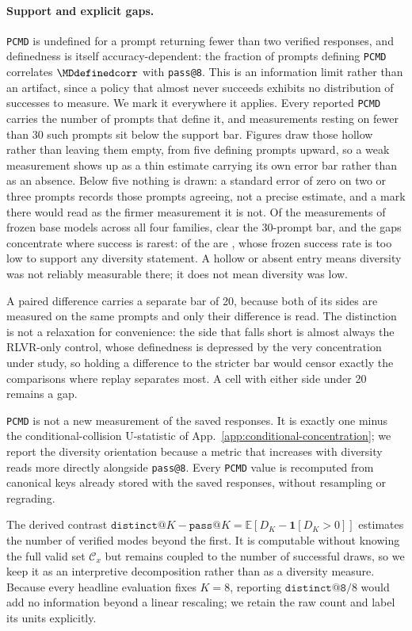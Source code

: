 \documentclass{article}
\newcommand{\1}{\mathbf 1}
\newcommand{\E}{\mathbb E}
\newcommand{\pmd}{\texttt{PCMD}}
\theoremstyle{remark}
\theoremstyle{definition}
\theoremstyle{plain}
\begin{document}
\paragraph{Support and explicit gaps.}
\pmd{} is undefined for a prompt returning fewer than two verified responses,
and definedness is itself accuracy-dependent: the fraction of prompts defining
\pmd{} correlates $\MDdefinedcorr$ with \texttt{pass@8}. This is an information
limit rather than an artifact, since a policy that almost never succeeds
exhibits no distribution of successes to measure. We mark it everywhere it
applies.
Every reported \pmd{} carries the number of prompts that define it, and
measurements resting on fewer than 30 such prompts sit below the support bar.
Figures draw those hollow rather than leaving them empty, from five defining
prompts upward, so a weak measurement shows up as a thin estimate carrying its
own error bar rather than as an absence. Below five nothing is drawn: a
standard error of zero on two or three prompts records those prompts agreeing,
not a precise estimate, and a mark there would read as the firmer measurement
it is not. Of the
\MDcells{} measurements of frozen base models across all four families,
\MDreportable{} clear the 30-prompt bar,
and the gaps concentrate where success is rarest: \MDtopgapcount{} of
the \MDgaps{} are \MDtopgapdomain{}, whose frozen success rate is too low to
support any diversity statement. A hollow or absent entry means diversity was
not reliably measurable there; it does not mean diversity was low.

A paired difference carries a separate bar of 20, because both of its sides are
measured on the same prompts and only their difference is read. The distinction
is not a relaxation for convenience: the side that falls short is almost always
the RLVR-only control, whose definedness is depressed by the very concentration
under study, so holding a difference to the stricter bar would censor exactly
the comparisons where replay separates most. A cell with either side under 20
remains a gap.

\pmd{} is not a new measurement of the saved responses. It is exactly one minus
the conditional-collision U-statistic of
App.~\ref{app:conditional-concentration}; we report the diversity orientation
because a metric that increases with diversity reads more directly alongside
\texttt{pass@8}. Every \pmd{} value
is recomputed from canonical keys already stored with the saved responses,
without resampling or regrading.

The derived contrast $\texttt{distinct@}K-\texttt{pass@}K=\E[D_K-\1[D_K>0]]$
estimates the number of verified modes beyond the first. It is computable
without knowing the full valid set $\mathcal C_x$ but remains coupled to the
number of successful draws, so we keep it as an interpretive decomposition
rather than as a diversity measure. Because every
headline evaluation fixes $K=8$, reporting $\texttt{distinct@8}/8$ would add no
information beyond a linear rescaling; we retain the raw count and label its
units explicitly.
\end{document}
